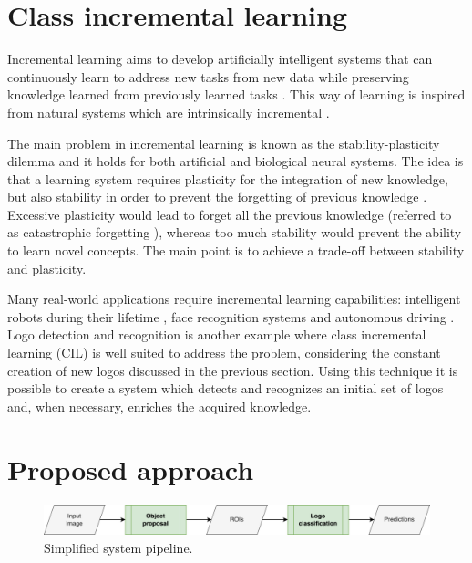 \section{Class incremental learning}
Incremental learning aims to develop artificially intelligent
systems that can continuously learn to address new tasks
from new data while preserving knowledge learned from
previously learned tasks \cite{masana2020class}. This way of learning is inspired from natural systems which are intrinsically incremental \cite{wu2019large}.

The main problem in incremental learning is known as the stability-plasticity dilemma and it holds for both artificial and biological neural systems. The idea is that a learning system requires plasticity for the integration of new knowledge, but also stability in order to prevent the forgetting of previous knowledge \cite{mermillod2013stability}. Excessive plasticity would lead to forget all the previous knowledge (referred to as catastrophic forgetting \cite{grossberg2013adaptive}), whereas too much stability would prevent the ability to learn novel concepts. The main point is to achieve a trade-off between stability and plasticity. 

Many real-world applications require incremental learning capabilities: intelligent robots during their lifetime \cite{thrun1995lifelong}, face recognition systems \cite{li2017incremental} and autonomous driving \cite{pierre2018incremental}. Logo detection and recognition is another example where class incremental learning (CIL) is well suited to address the problem, considering the constant creation of new logos discussed in the previous section. Using this technique it is possible to create a system which detects and recognizes an initial set of logos and, when necessary, enriches the acquired knowledge.

\section{Proposed approach}

\begin{figure}
    \begin{center}
        \includegraphics[width=\columnwidth]{images/pipeline.drawio.png}
    \end{center}
    \caption{Simplified system pipeline.}
    \label{fig:system-pipeline}
\end{figure}


